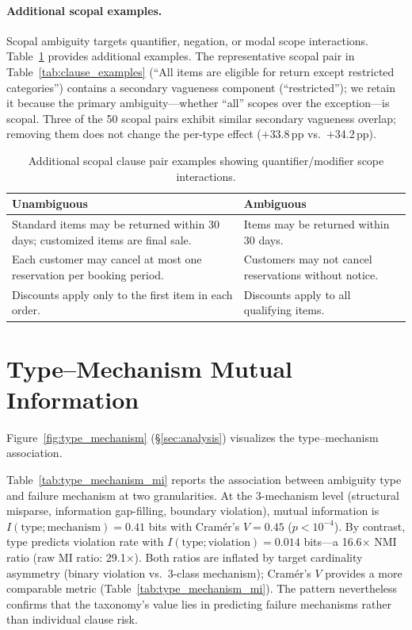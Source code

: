 \paragraph{Additional scopal examples.} Scopal ambiguity targets quantifier, negation, or modal scope interactions. Table~\ref{tab:scopal_examples} provides additional examples. The representative scopal pair in Table~\ref{tab:clause_examples} (``All items are eligible for return except restricted categories'') contains a secondary vagueness component (``restricted''); we retain it because the primary ambiguity---whether ``all'' scopes over the exception---is scopal. Three of the 50 scopal pairs exhibit similar secondary vagueness overlap; removing them does not change the per-type effect ($+$33.8\,pp vs.\ $+$34.2\,pp).

\begin{table}[!ht]
\centering
\footnotesize
\caption{Additional scopal clause pair examples showing quantifier/modifier scope interactions.}
\label{tab:scopal_examples}
\begin{tabular}{p{3.5cm}p{3.5cm}}
\toprule
\textbf{Unambiguous} & \textbf{Ambiguous} \\
\midrule
Standard items may be returned within 30 days; customized items are final sale. & Items may be returned within 30 days. \\
\addlinespace
Each customer may cancel at most one reservation per booking period. & Customers may not cancel reservations without notice. \\
\addlinespace
Discounts apply only to the first item in each order. & Discounts apply to all qualifying items. \\
\bottomrule
\end{tabular}
\end{table}

\section{Type--Mechanism Mutual Information}
\label{app:type_mechanism}

Figure~\ref{fig:type_mechanism} (\S\ref{sec:analysis}) visualizes the type--mechanism association.

Table~\ref{tab:type_mechanism_mi} reports the association between ambiguity type and failure mechanism at two granularities. At the 3-mechanism level (structural misparse, information gap-filling, boundary violation), mutual information is $I(\text{type}; \text{mechanism}) = 0.41$ bits with Cramér's $V = 0.45$ ($p < 10^{-4}$). By contrast, type predicts violation rate with $I(\text{type}; \text{violation}) = 0.014$ bits---a 16.6$\times$ NMI ratio (raw MI ratio: 29.1$\times$). Both ratios are inflated by target cardinality asymmetry (binary violation vs.\ 3-class mechanism); Cram\'{e}r's $V$ provides a more comparable metric (Table~\ref{tab:type_mechanism_mi}). The pattern nevertheless confirms that the taxonomy's value lies in predicting failure mechanisms rather than individual clause risk.

